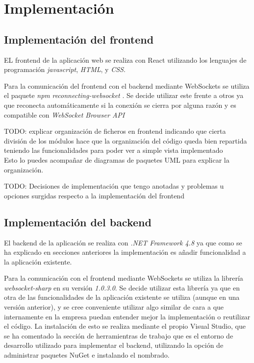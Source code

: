 \chapter{Implementación}


\section{Implementación del frontend}

EL frontend de la aplicación web se realiza con React utilizando los lenguajes de programación \textit{javascript}, \textit{HTML}, y \textit{CSS}.

Para la comunicación del frontend con el backend mediante WebSockets se utiliza el paquete \textit{npm} \textit{reconnecting-websocket} \cite{reconect-ws}. Se decide utilizar este frente a otros ya que reconecta automáticamente si la conexión se cierra por alguna razón y es compatible con \textit{WebSocket Browser API} \cite{api-ws-front}\newline

TODO: explicar organización de ficheros en frontend indicando que cierta división de los módulos hace que la organización del código queda bien repartida teniendo las funcionalidades para poder ver a simple vista implementado \\
Esto lo puedes acompañar de diagramas de paquetes UML para explicar la organización.


TODO: Decisiones de implementación que tengo anotadas y problemas u opciones surgidas respecto a la implementación del frontend \\



\section{Implementación del backend}

El backend de la aplicación se realiza con \textit{.NET Framework 4.8} ya que como se ha explicado en secciones anteriores la implementación es añadir funcionalidad a la aplicación existente. \newline

Para la comunicación con el frontend mediante WebSockets se utiliza la librería \textit{websocket-sharp} \cite{websocket-sharp} en su versión \textit{1.0.3.0}.
Se decide utilizar esta librería ya que en otra de las funcionalidades de la aplicación existente se utiliza (aunque en una versión anterior), y se cree conveniente utilizar algo similar de cara a que internamente en la empresa puedan entender mejor la implementación o reutilizar el código.
La instalación de esto se realiza mediante el propio Visual Studio, que se ha comentado la sección de herramientras de trabajo que es el entorno de desarrollo utilizado para implementar el backend, utilizando la opción de administrar paquetes NuGet e instalando el nombrado. \newline 

